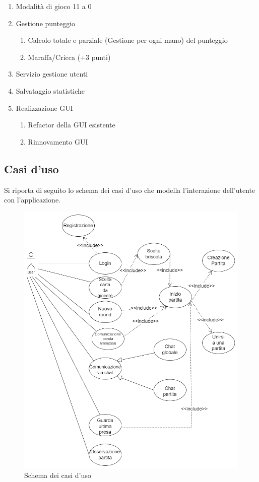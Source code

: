 \begin{enumerate}
    \item Modalità di gioco 11 a 0
    \item Gestione punteggio
        \begin{enumerate}
            \item Calcolo totale e parziale (Gestione per ogni mano) del punteggio
            \item Maraffa/Cricca (+3 punti)
        \end{enumerate}
    \item Servizio gestione utenti
    \item Salvataggio statistiche
    \item Realizzazione GUI
        \begin{enumerate}
            \item Refactor della GUI esistente
            \item Rinnovamento GUI
        \end{enumerate}
\end{enumerate}

\subsection{Casi d'uso}
Si riporta di seguito lo schema dei casi d'uso che modella l'interazione dell'utente con l'applicazione.
\begin{figure}[h!]
\centering 
\includegraphics[scale=0.45]{report/img/Casi_duso.png}
\caption{Schema dei casi d'uso}
\label{use_case}
\end{figure}

